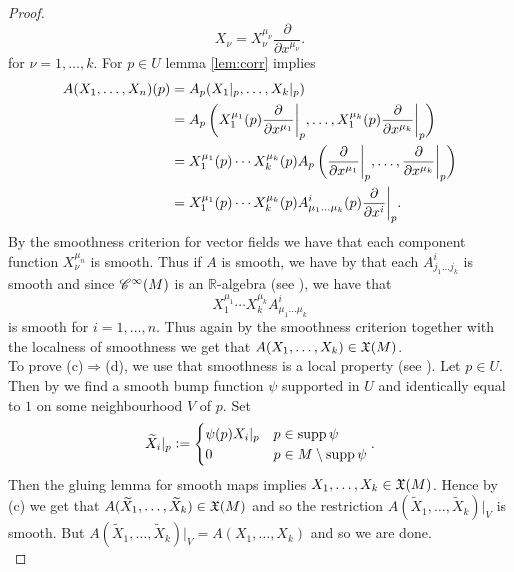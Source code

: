 \begin{appendix}
\begin{proof}
\begin{equation*}
X_\nu = X^{\mu_\nu}_\nu \frac{\partial}{\partial x^{\mu_\nu}}.
\end{equation*}
\noindent for $\nu = 1,\dots,k$. For $p \in U$ lemma \ref{lem:corr} implies
\begin{align*}
A(X_1,\dots,X_n)(p) &= A_p(X_1\vert_p,\dots,X_k\vert_p)\\
&= A_p\del[3]{X^{\mu_1}_1(p) \frac{\partial}{\partial x^{\mu_1}}\bigg\vert_p,\dots,X^{\mu_k}_1(p) \frac{\partial}{\partial x^{\mu_k}}\bigg\vert_p}\\
&= X^{\mu_1}_1(p) \cdots X^{\mu_k}_k(p)A_p\del[3]{\frac{\partial}{\partial x^{\mu_1}}\bigg\vert_p,\dots,\frac{\partial}{\partial x^{\mu_k}}\bigg\vert_p}\\
&= X^{\mu_1}_1(p) \cdots X^{\mu_k}_k(p) A^i_{\mu_1 \dots \mu_k}(p)\frac{\partial}{\partial x^i}\bigg\vert_p.
\end{align*}
By the smoothness criterion for vector fields \cite[175]{lee:smooth_manifolds:2013} we have that each component function $X^{\mu_n}_\nu$ is smooth. Thus if $A$ is smooth, we have by  that each $A^i_{j_1\dots j_k}$ is smooth and since $\mathscr{C}^\infty(M)$ is an $\mathbb{R}$-algebra (see \cite[33]{lee:smooth_manifolds:2013}), we have that 
\begin{equation*}
X^{\mu_1}_1 \cdots X^{\mu_k}_k A^i_{\mu_1 \dots \mu_k}
\end{equation*} 
\noindent is smooth for $i = 1,\dots,n$. Thus again by the smoothness criterion together with the localness of smoothness \cite[35]{lee:smooth_manifolds:2013} we get that $A(X_1,\dots,X_k) \in \mathfrak{X}(M)$.\\
To prove (c)$\Rightarrow$(d), we use that smoothness is a local property (see \cite[35]{lee:smooth_manifolds:2013}). Let $p \in U$.  Then by \cite[14]{cattaneo:manifolds:2017} we find a smooth bump function $\psi$ supported in $U$ and identically equal to $1$ on some neighbourhood $V$ of $p$. Set 
\begin{align*}
\widetilde{X}_i\vert_p := \begin{cases}
\psi(p) X_i\vert_p & p \in \operatorname{supp} \psi\\
0 & p \in M \setminus \operatorname{supp} \psi
\end{cases}.
\end{align*}
Then the gluing lemma for smooth maps \cite[35]{lee:smooth_manifolds:2013} implies $X_1,\dots,X_k \in \mathfrak{X}(M)$. Hence by (c) we get that $A(\widetilde{X}_1,\dots,\widetilde{X}_k) \in \mathfrak{X}(M)$ and so the restriction $A(\widetilde{X}_1,\dots,\widetilde{X}_k)\vert_V$ is smooth. But $A(\widetilde{X}_1,\dots,\widetilde{X}_k)\vert_V = A(X_1,\dots,X_k)$ and so we are done.\\

\end{proof}
\end{appendix}
